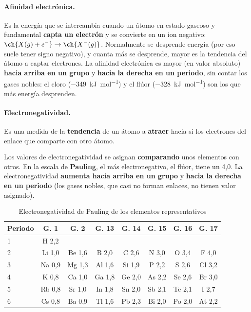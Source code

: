 \paragraph{Afinidad electrónica.} Es la energía que se intercambia cuando un átomo en estado gaseoso y fundamental
\textbf{capta un electrón} y se convierte en un ion negativo: \(\ch{X(g) + e^-} \rightarrow \ch{X^-(g)}\). Normalmente se
desprende energía (por eso suele tener signo negativo), y cuanta más se desprende, mayor es la tendencia del átomo a captar
electrones. La afinidad electrónica es mayor (en valor absoluto) \textbf{hacia arriba en un grupo} y \textbf{hacia la derecha en
un periodo}, sin contar los gases nobles: el cloro (\qty{-349}{\kilo\joule\per\mol}) y el flúor
(\qty{-328}{\kilo\joule\per\mol}) son los que más energía desprenden.

\paragraph{Electronegatividad.}

\begin{definition}[Electronegatividad]
    Es una medida de la \textbf{tendencia} de un átomo a \textbf{atraer} hacia sí los electrones del enlace que comparte con otro
    átomo.
\end{definition}

Los valores de electronegatividad se asignan \textbf{comparando} unos elementos con otros. En la escala de \textbf{Pauling}, el
más electronegativo, el flúor, tiene un 4,0. La electronegatividad \textbf{aumenta hacia arriba en un grupo} y \textbf{hacia la
derecha en un periodo} (los gases nobles, que casi no forman enlaces, no tienen valor asignado).

\begin{table}[H]
    \centering
    \caption{Electronegatividad de Pauling de los elementos representativos}
    \vspace{-5pt}
    \begin{tabular}{@{}lccccccc@{}}
        \toprule
        \textbf{Periodo} & \textbf{G. 1} & \textbf{G. 2} & \textbf{G. 13} & \textbf{G. 14} & \textbf{G. 15} & \textbf{G. 16} & \textbf{G. 17} \\
        \midrule
        1 & H 2,2 & & & & & & \\[3pt]
        2 & Li 1,0 & Be 1,6 & B 2,0 & C 2,6 & N 3,0 & O 3,4 & F 4,0 \\[3pt]
        3 & Na 0,9 & Mg 1,3 & Al 1,6 & Si 1,9 & P 2,2 & S 2,6 & Cl 3,2 \\[3pt]
        4 & K 0,8 & Ca 1,0 & Ga 1,8 & Ge 2,0 & As 2,2 & Se 2,6 & Br 3,0 \\[3pt]
        5 & Rb 0,8 & Sr 1,0 & In 1,8 & Sn 2,0 & Sb 2,1 & Te 2,1 & I 2,7 \\[3pt]
        6 & Cs 0,8 & Ba 0,9 & Tl 1,6 & Pb 2,3 & Bi 2,0 & Po 2,0 & At 2,2 \\
        \bottomrule
    \end{tabular}
    \label{tab:ud3-en}
\end{table}

